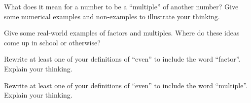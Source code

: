 \documentclass[nooutcomes,noauthor,handout]{ximera}
\begin{document}
\begin{problem} What does it mean for a number to be a ``multiple'' of another number? Give some numerical examples and non-examples to illustrate your thinking.
\end{problem}


\begin{problem} Give some real-world examples of factors and multiples. Where do these ideas come up in school or otherwise?
\end{problem}

\begin{problem} Rewrite at least one of your definitions of ``even'' to include the word ``factor''. Explain your thinking.
\end{problem}

\begin{problem} Rewrite at least one of your definitions of ``even'' to include the word ``multiple''. Explain your thinking.
\end{problem}
\end{document}

